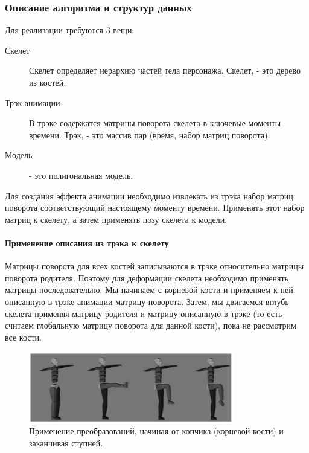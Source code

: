 \subsubsection{Описание алгоритма и структур данных}
Для реализации требуются 3 вещи: 
\begin{description}
\item[Скелет] Скелет определяет иерархию частей тела персонажа. 
Скелет, - это дерево из костей.

\item[Трэк анимации] В трэке содержатся матрицы поворота скелета в ключевые моменты времени.
Трэк, - это массив пар (время, набор матриц поворота).

\item[Модель]  - это полигональная модель.
\end{description}

Для создания эффекта анимации необходимо извлекать из трэка набор матриц поворота соответствующий настоящему моменту времени. Применять этот набор матриц к скелету, а затем применять позу скелета к модели.

\paragraph{Применение описания из трэка к скелету}
Матрицы поворота для всех костей записываются в трэке относительно матрицы поворота родителя.
Поэтому для деформации скелета необходимо применять матрицы последовательно.
Мы начинаем с корневой кости и применяем к ней описанную в трэке анимации матрицу поворота.
Затем, мы двигаемся вглубь скелета применяя матрицу родителя и матрицу описанную в трэке (то есть считаем глобальную матрицу поворота для данной кости), пока не рассмотрим все кости.

\begin{figure}[h!]
    \centering
    \includegraphics[width=0.8\textwidth]{forward_kinematics.png}
    \caption{\scriptsize{Применение преобразований, начиная от копчика (корневой кости) и заканчивая ступней.}}
\end{figure}

